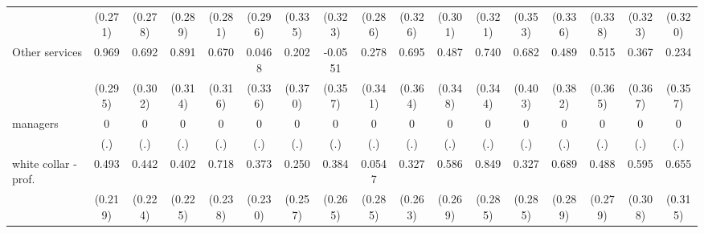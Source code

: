 {\begin{tabular}{l*{16}{c}}
                    &     (0.271)         &     (0.278)         &     (0.289)         &     (0.281)         &     (0.296)         &     (0.335)         &     (0.323)         &     (0.286)         &     (0.326)         &     (0.301)         &     (0.321)         &     (0.353)         &     (0.336)         &     (0.338)         &     (0.323)         &     (0.320)         \\
[1em]
Other services      &       0.969\sym{**} &       0.692\sym{*}  &       0.891\sym{**} &       0.670\sym{*}  &      0.0468         &       0.202         &     -0.0551         &       0.278         &       0.695         &       0.487         &       0.740\sym{*}  &       0.682         &       0.489         &       0.515         &       0.367         &       0.234         \\
                    &     (0.295)         &     (0.302)         &     (0.314)         &     (0.316)         &     (0.336)         &     (0.370)         &     (0.357)         &     (0.341)         &     (0.364)         &     (0.348)         &     (0.344)         &     (0.403)         &     (0.382)         &     (0.365)         &     (0.367)         &     (0.357)         \\
[1em]
managers            &           0         &           0         &           0         &           0         &           0         &           0         &           0         &           0         &           0         &           0         &           0         &           0         &           0         &           0         &           0         &           0         \\
                    &         (.)         &         (.)         &         (.)         &         (.)         &         (.)         &         (.)         &         (.)         &         (.)         &         (.)         &         (.)         &         (.)         &         (.)         &         (.)         &         (.)         &         (.)         &         (.)         \\
[1em]
white collar - prof.&       0.493\sym{*}  &       0.442\sym{*}  &       0.402         &       0.718\sym{**} &       0.373         &       0.250         &       0.384         &      0.0547         &       0.327         &       0.586\sym{*}  &       0.849\sym{**} &       0.327         &       0.689\sym{*}  &       0.488         &       0.595         &       0.655\sym{*}  \\
                    &     (0.219)         &     (0.224)         &     (0.225)         &     (0.238)         &     (0.230)         &     (0.257)         &     (0.265)         &     (0.285)         &     (0.263)         &     (0.269)         &     (0.285)         &     (0.285)         &     (0.289)         &     (0.279)         &     (0.308)         &     (0.315)         \\

\end{tabular}}

